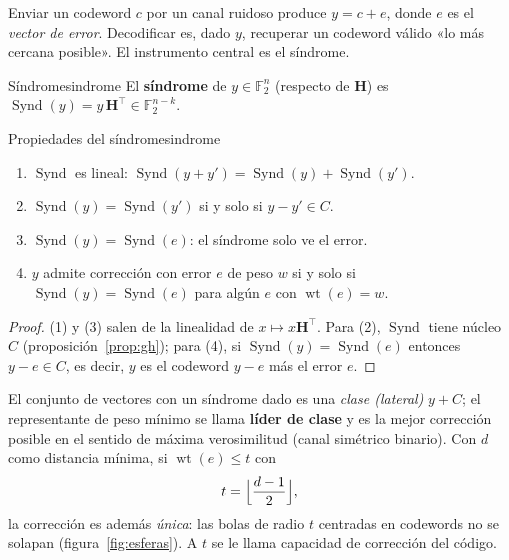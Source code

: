 \documentclass[11pt,a4paper,oneside]{report}
\newcommand{\F}{\mathbb{F}}
\newcommand{\wt}{\operatorname{wt}}
\newcommand{\Hmat}{\mathbf{H}}          %
\newcommand{\Ftwo}{\F_2}
\newcommand{\Syn}{\operatorname{Synd}}
\begin{document}
Enviar un codeword $c$ por un canal ruidoso produce $y=c+e$, donde $e$ es
el \emph{vector de error}. Decodificar es, dado $y$, recuperar un
codeword válido «lo más cercana posible». El instrumento central es el
síndrome.

\begin{definicion}{Síndrome}{sindrome}
El \textbf{síndrome} de $y\in\Ftwo^n$ (respecto de $\Hmat$) es
$\Syn(y)=y\,\Hmat^{\top}\in\Ftwo^{n-k}$.
\end{definicion}

\begin{proposicion}{Propiedades del síndrome}{sindrome}
\begin{enumerate}[leftmargin=1.6em,itemsep=1pt]
  \item $\Syn$ es lineal: $\Syn(y+y')=\Syn(y)+\Syn(y')$.
  \item $\Syn(y)=\Syn(y')$ si y solo si $y-y'\in C$.
  \item $\Syn(y)=\Syn(e)$: el síndrome solo ve el error.
  \item $y$ admite corrección con error $e$ de peso $w$ si y solo si
        $\Syn(y)=\Syn(e)$ para algún $e$ con $\wt(e)=w$.
\end{enumerate}
\end{proposicion}
\begin{proof}
(1) y (3) salen de la linealidad de $x\mapsto x\Hmat^{\top\!}$. Para (2),
$\Syn$ tiene núcleo $C$ (proposición~\ref{prop:gh}); para (4), si
$\Syn(y)=\Syn(e)$ entonces $y-e\in C$, es decir, $y$ es el codeword $y-e$
más el error $e$.
\end{proof}

El conjunto de vectores con un síndrome dado es una \emph{clase
(lateral)} $y+C$; el representante de peso mínimo se llama
\textbf{líder de clase} y es la mejor corrección posible en el sentido de
máxima verosimilitud (canal simétrico binario). Con $d$ como distancia
mínima, si $\wt(e)\le t$ con
\begin{equation}
t=\Bigl\lfloor\frac{d-1}{2}\Bigr\rfloor,
\label{eq:radio}
\end{equation}
la corrección es además \emph{única}: las bolas de radio $t$ centradas en
codewords no se solapan (figura~\ref{fig:esferas}). A $t$ se le llama
capacidad de corrección del código.
\end{document}
